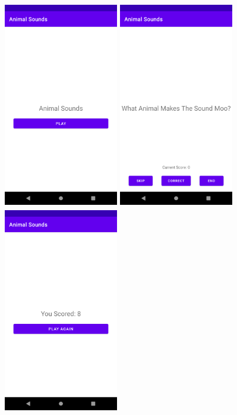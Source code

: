 \documentclass{article}
\begin{document}
\includegraphics[width=5cm, height=9cm]{../../resources/img/practicals/03-animal-sounds-1.png}
\includegraphics[width=5cm, height=9cm]{../../resources/img/practicals/03-animal-sounds-2.png}
\includegraphics[width=5cm, height=9cm]{../../resources/img/practicals/03-animal-sounds-3.png} \\
\end{document}
